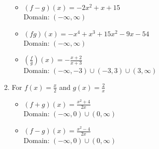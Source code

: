 \begin{enumerate}
\begin{multicols}{2}
\begin{itemize}
      \vfill
      
      \columnbreak
      
\item $(f-g)(x) = -2x^2+x+15$ \\
      Domain:  $(-\infty, \infty)$


\end{itemize}

\end{multicols}

\begin{multicols}{2}

\begin{itemize}

\item $(fg)(x) = -x^4+x^3+15x^2-9x-54$ \\
      Domain: $(-\infty, \infty)$
      
      \vfill
      
      \columnbreak
      
\item $\left(\frac{f}{g}\right)(x) = -\frac{x+2}{x+3}$ \\
      Domain:  $\left(-\infty, -3 \right) \cup \left(-3, 3 \right) \cup (3, \infty)$


\end{itemize}

\end{multicols}


\item For  $f(x) = \frac{x}{2}$ and $g(x) = \frac{2}{x}$

\begin{multicols}{2}

\begin{itemize}

\item $(f+g)(x) = \frac{x^2+4}{2x}$ \\
      Domain: $(-\infty, 0) \cup (0, \infty)$
      
      \vfill
      
      \columnbreak
      
\item $(f-g)(x) = \frac{x^2-4}{2x}$ \\
      Domain:  $(-\infty,0) \cup (0, \infty)$


\end{itemize}

\end{multicols}

\begin{multicols}{2}


\end{multicols}
\end{enumerate}
